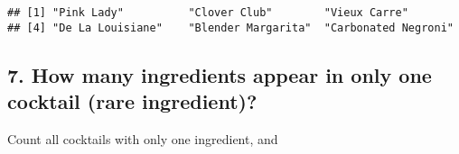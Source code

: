 \documentclass[
]{article}
\newenvironment{Shaded}{\begin{snugshade}}{\end{snugshade}}
\newcommand{\DataTypeTok}[1]{\textcolor[rgb]{0.13,0.29,0.53}{#1}}
\newcommand{\KeywordTok}[1]{\textcolor[rgb]{0.13,0.29,0.53}{\textbf{#1}}}
\newcommand{\NormalTok}[1]{#1}
\newcommand{\OperatorTok}[1]{\textcolor[rgb]{0.81,0.36,0.00}{\textbf{#1}}}
\begin{document}
\begin{verbatim}
## [1] "Pink Lady"          "Clover Club"        "Vieux Carre"       
## [4] "De La Louisiane"    "Blender Margarita"  "Carbonated Negroni"
\end{verbatim}

\hypertarget{how-many-ingredients-appear-in-only-one-cocktail-rare-ingredient}{%
\subsection{7. How many ingredients appear in only one cocktail (rare
ingredient)?}\label{how-many-ingredients-appear-in-only-one-cocktail-rare-ingredient}}

Count all cocktails with only one ingredient, and

\begin{Shaded}
\end{Shaded}
\end{document}
